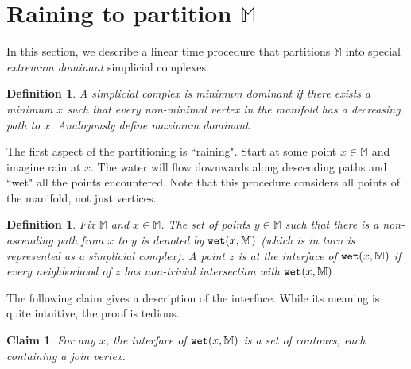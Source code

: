 \documentclass[11pt]{article}
\newtheorem{claim}[theorem]{Claim}
\newtheorem{definition}[theorem]{Definition}
\theoremstyle{definition}
\newcommand{\MM}{\mathbb{M}}
\newcommand{\wet}{{\tt wet}}
\begin{document}
\section{Raining to partition $\MM$} \label{sec:rain}

In this section, we describe a linear time procedure that partitions $\MM$ into special
\emph{extremum dominant} simplicial complexes.

\begin{definition} \label{def:dom} A simplicial complex is \emph{minimum dominant} if there exists
a minimum $x$ such that every non-minimal \emph{vertex} in the manifold has a decreasing path to $x$.
Analogously define \emph{maximum dominant}. 
\end{definition}

The first aspect of the partitioning is ``raining". Start at some point $x \in \MM$ and imagine rain at $x$.
The water will flow downwards along descending paths and ``wet" all the points encountered. Note that this procedure considers all points
of the manifold, not just vertices.

\begin{definition} \label{def:wet} Fix $\MM$ and $x \in \MM$. The set of points $y \in \MM$ such that there is a non-ascending path from $x$ to $y$
is denoted by $\wet(x,\MM)$ (which is in turn is represented as a simplicial complex). A point $z$ is at the \emph{interface} of $\wet(x,\MM)$ if every neighborhood of $z$
has non-trivial intersection with $\wet(x,\MM)$.
\end{definition}

The following claim gives a description of the interface. While its meaning is quite intuitive, the proof is tedious.

\begin{claim} \label{clm:inter} For any $x$, the interface of $\wet(x,\MM)$ is a set of contours,
each containing a join vertex.
\end{claim}
\end{document}
